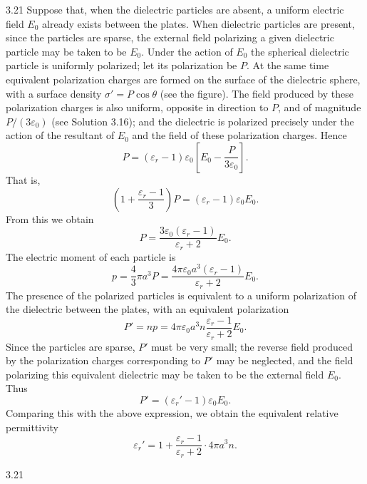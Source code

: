 \begin{solution}{3.21}
Suppose that, when the dielectric particles are absent, a uniform electric field $E_0$ already exists between the plates. When dielectric particles are present, since the particles are sparse, the external field polarizing a given dielectric particle may be taken to be $E_0$. Under the action of $E_0$ the spherical dielectric particle is uniformly polarized; let its polarization be $P$. At the same time equivalent polarization charges are formed on the surface of the dielectric sphere, with a surface density $\sigma'=P\cos\theta$ (see the figure). The field produced by these polarization charges is also uniform, opposite in direction to $P$, and of magnitude $P/(3\varepsilon_0)$ (see Solution 3.16); and the dielectric is polarized precisely under the action of the resultant of $E_0$ and the field of these polarization charges. Hence
\[
P=(\varepsilon_r-1)\varepsilon_0\left[E_0-\frac{P}{3\varepsilon_0}\right].
\]
That is,
\[
\left(1+\frac{\varepsilon_r-1}{3}\right)P=(\varepsilon_r-1)\varepsilon_0E_0.
\]
From this we obtain
\[
P=\frac{3\varepsilon_0(\varepsilon_r-1)}{\varepsilon_r+2}E_0.
\]
The electric moment of each particle is
\[
p=\frac{4}{3}\pi a^3P
=\frac{4\pi\varepsilon_0a^3(\varepsilon_r-1)}{\varepsilon_r+2}E_0.
\]
The presence of the polarized particles is equivalent to a uniform polarization of the dielectric between the plates, with an equivalent polarization
\[
P'=np=4\pi\varepsilon_0a^3n\frac{\varepsilon_r-1}{\varepsilon_r+2}E_0.
\]
Since the particles are sparse, $P'$ must be very small; the reverse field produced by the polarization charges corresponding to $P'$ may be neglected, and the field polarizing this equivalent dielectric may be taken to be the external field $E_0$. Thus
\[
P'=(\varepsilon_r'-1)\varepsilon_0E_0.
\]
Comparing this with the above expression, we obtain the equivalent relative permittivity
\[
\varepsilon_r'=1+\frac{\varepsilon_r-1}{\varepsilon_r+2}\cdot4\pi a^3n.
\]

\begin{figbox}{3.21}
\end{figbox}
\end{solution}

